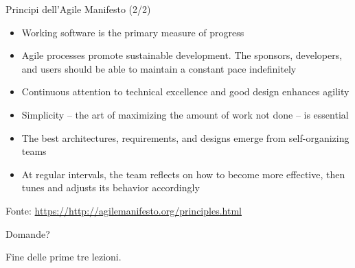 \documentclass{beamer}
\begin{document}
\begin{frame}{\centerline{Principi dell'Agile Manifesto (2/2)}}

\begin{itemize}
\item  Working software is the primary measure of progress
\item  Agile processes promote sustainable development. The sponsors, developers, and users should be able to maintain a constant pace indefinitely
\item  Continuous attention to technical excellence and good design enhances agility
\item  Simplicity -- the art of maximizing the amount of work not done -- is essential
\item  The best architectures, requirements, and designs emerge from self-organizing teams
\item  At regular intervals, the team reflects on how to become more effective, then tunes and adjusts its behavior accordingly
\end{itemize}

\begin{center}
\tiny
Fonte: \url{https://http://agilemanifesto.org/principles.html}
\end{center}

\end{frame}





\begin{frame}
{\centerline{Domande?}}
\vspace{1cm}
\begin{center}
    \LARGE{Fine delle prime tre lezioni.}
\end{center}

\end{frame}
\end{document}
